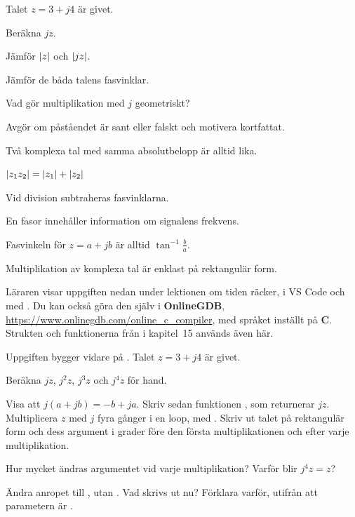 Talet $z = 3 + j4$ är givet.
\begin{parts}
  \item Beräkna $jz$.
  \item Jämför $\lvert z\rvert$ och $\lvert jz\rvert$.
  \item Jämför de båda talens fasvinklar.
  \item Vad gör multiplikation med $j$ geometriskt?
\end{parts}

Avgör om påståendet är sant eller falskt och motivera kortfattat.
\begin{parts}
  \item Två komplexa tal med samma absolutbelopp är alltid lika.
  \item $\lvert z_1z_2\rvert = \lvert z_1\rvert + \lvert z_2\rvert$
  \item Vid division subtraheras fasvinklarna.
  \item En fasor innehåller information om signalens frekvens.
  \item Fasvinkeln för $z = a + jb$ är alltid $\tan^{-1}\frac{b}{a}$.
  \item Multiplikation av komplexa tal är enklast på rektangulär form.
\end{parts}

Läraren visar uppgiften nedan under lektionen om tiden räcker, i VS Code och med .
Du kan också göra den
själv i \textbf{OnlineGDB}, \url{https://www.onlinegdb.com/online_c_compiler}, med språket inställt
på \textbf{C}. Strukten  och funktionerna från  i kapitel~15 används
även här.

Uppgiften bygger vidare på . Talet $z = 3 + j4$ är givet.
\begin{parts}
  \item Beräkna $jz$, $j^2 z$, $j^3 z$ och $j^4 z$ för hand.
  \item Visa att $j(a + jb) = -b + ja$. Skriv sedan funktionen , som returnerar $jz$. Multiplicera $z$ med $j$ fyra gånger
    i en loop, med . Skriv ut talet på rektangulär form och dess
    argument i grader före den första multiplikationen och efter varje multiplikation.
  \item Hur mycket ändras argumentet vid varje multiplikation? Varför blir $j^4 z = z$?
  \item Ändra anropet till , utan . Vad skrivs ut nu? Förklara
    varför, utifrån att parametern är .
\end{parts}
